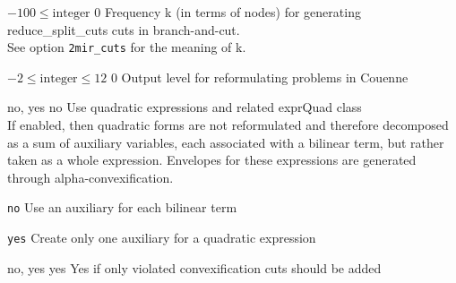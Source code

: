 %
{$-100\leq\textrm{integer}$}%
{$0$}%
{Frequency k (in terms of nodes) for generating reduce\_split\_cuts cuts in branch-and-cut.\\
See option \texttt{2mir\_cuts} for the meaning of k.}%
{}

%
{$-2\leq\textrm{integer}\leq12$}%
{$0$}%
{Output level for reformulating problems in Couenne}%
{}

%
{\ttfamily no, yes}%
{no}%
{Use quadratic expressions and related exprQuad class\\
If enabled, then quadratic forms are not reformulated and therefore decomposed as a sum of auxiliary variables, each associated with a bilinear term, but rather taken as a whole expression. Envelopes for these expressions are generated through alpha-convexification.}%
{\begin{list}{}{
\setlength{\parsep}{0em}
\setlength{\leftmargin}{5ex}
\setlength{\labelwidth}{2ex}
\setlength{\itemindent}{0ex}
\setlength{\topsep}{0pt}}
\item[\texttt{no}] Use an auxiliary for each bilinear term
\item[\texttt{yes}] Create only one auxiliary for a quadratic expression
\end{list}
}

%
{\ttfamily no, yes}%
{yes}%
{Yes if only violated convexification cuts should be added}%
{}

